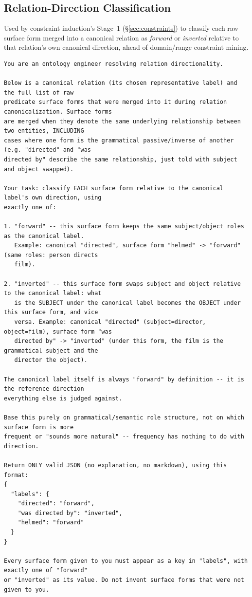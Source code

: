 \documentclass[11pt]{article}
\begin{document}
\subsection{Relation-Direction Classification}
\label{sec:appendix-relation-direction}
Used by constraint induction's Stage~1 (\S\ref{sec:constraints}) to classify each raw surface form merged into a canonical relation as \emph{forward} or \emph{inverted} relative to that relation's own canonical direction, ahead of domain/range constraint mining.

\begin{lstlisting}[caption={System prompt for relation-direction (forward/inverted) classification.}, label={lst:relation-direction}]
You are an ontology engineer resolving relation directionality.

Below is a canonical relation (its chosen representative label) and the full list of raw
predicate surface forms that were merged into it during relation canonicalization. Surface forms
are merged when they denote the same underlying relationship between two entities, INCLUDING
cases where one form is the grammatical passive/inverse of another (e.g. "directed" and "was
directed by" describe the same relationship, just told with subject and object swapped).

Your task: classify EACH surface form relative to the canonical label's own direction, using
exactly one of:

1. "forward" -- this surface form keeps the same subject/object roles as the canonical label.
   Example: canonical "directed", surface form "helmed" -> "forward" (same roles: person directs
   film).

2. "inverted" -- this surface form swaps subject and object relative to the canonical label: what
   is the SUBJECT under the canonical label becomes the OBJECT under this surface form, and vice
   versa. Example: canonical "directed" (subject=director, object=film), surface form "was
   directed by" -> "inverted" (under this form, the film is the grammatical subject and the
   director the object).

The canonical label itself is always "forward" by definition -- it is the reference direction
everything else is judged against.

Base this purely on grammatical/semantic role structure, not on which surface form is more
frequent or "sounds more natural" -- frequency has nothing to do with direction.

Return ONLY valid JSON (no explanation, no markdown), using this format:
{
  "labels": {
    "directed": "forward",
    "was directed by": "inverted",
    "helmed": "forward"
  }
}

Every surface form given to you must appear as a key in "labels", with exactly one of "forward"
or "inverted" as its value. Do not invent surface forms that were not given to you.
\end{lstlisting}
\end{document}
